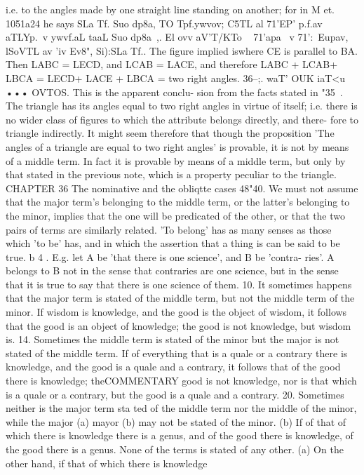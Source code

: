 {{{{{{{{{{{{{{{{{{{{{{{{{{i.e. to the angles made by one straight line standing on another;
for in M et. 1051a24 he says SLa Tf. Suo dp8a, TO Tpf.ywvov; C5TL al 71'EP'
p.f.av aTLYp.~v ywvf.aL taaL Suo dp8a~,. El ovv aV'T/KTo ~ 71'apa ~v
71':\ Eupav, lSoVTL av 'iv Ev8", Si):\ov SLa Tf.. The figure implied iswhere CE is parallel to BA. Then LABC = LECD, and
LCAB = LACE, and therefore LABC + LCAB+ LBCA =
LECD+ LACE + LBCA = two right angles.
36--;. waT' OUK iaT<u ••• OVTOS. This is the apparent conclu-
sion from the facts stated in "35~. The triangle has its angles
equal to two right angles in virtue of itself; i.e. there is no wider
class of figures to which the attribute belongs directly, and there-
fore to triangle indirectly. It might seem therefore that though
the proposition 'The angles of a triangle are equal to two right
angles' is provable, it is not by means of a middle term. In fact
it is provable by means of a middle term, but only by that stated
in the previous note, which is a property peculiar to the triangle.
CHAPTER 36
The nominative and the obliqtte cases
48"40. We must not assume that the major term's belonging
to the middle term, or the latter's belonging to the minor, implies
that the one will be predicated of the other, or that the two pairs
of terms are similarly related. 'To belong' has as many senses as
those which 'to be' has, and in which the assertion that a thing is
can be said to be true.
b 4 . E.g. let A be 'that there is one science', and B be 'contra-
ries'. A belongs to B not in the sense that contraries are one
science, but in the sense that it is true to say that there is one
science of them.
10. It sometimes happens that the major term is stated of the
middle term, but not the middle term of the minor. If wisdom is
knowledge, and the good is the object of wisdom, it follows that
the good is an object of knowledge; the good is not knowledge,
but wisdom is.
14. Sometimes the middle term is stated of the minor but the
major is not stated of the middle term. If of everything that is a
quale or a contrary there is knowledge, and the good is a quale
and a contrary, it follows that of the good there is knowledge; theCOMMENTARY
good is not knowledge, nor is that which is a quale or a contrary,
but the good is a quale and a contrary.
20. Sometimes neither is the major term sta ted of the middle
term nor the middle of the minor, while the major (a) mayor (b)
may not be stated of the minor. (b) If of that of which there is
knowledge there is a genus, and of the good there is knowledge,
of the good there is a genus. None of the terms is stated of any
other. (a) On the other hand, if that of which there is knowledge
}}}}}}}}}}}}}}}}}}}}}}}}}}
